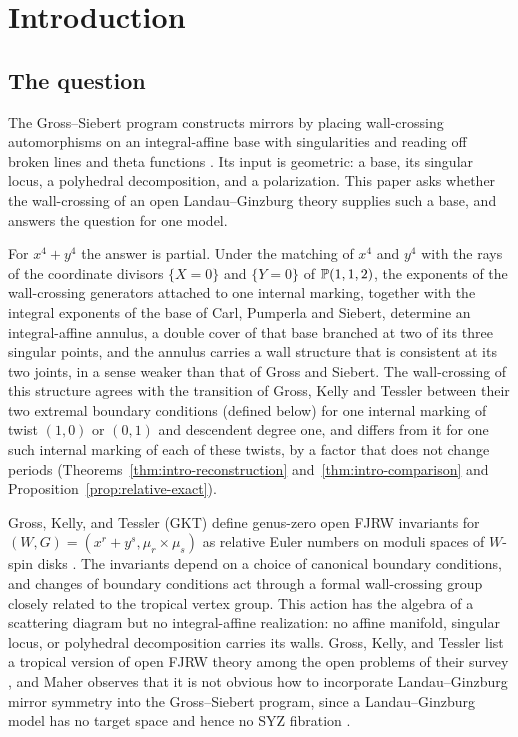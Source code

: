 \section{Introduction}\label{sec:introduction}

\subsection{The question}

The Gross--Siebert program constructs mirrors by placing wall-crossing
automorphisms on an integral-affine base with singularities and reading off
broken lines and theta functions
\cite{grosshackingkeel2015,grossetal2018canonical,grosssiebert2022}.  Its
input is geometric: a base, its singular locus, a polyhedral decomposition,
and a polarization.  This paper asks whether the wall-crossing of an open
Landau--Ginzburg theory supplies such a base, and answers the question for
one model.

For $x^4+y^4$ the answer is partial.  Under the matching of $x^4$ and $y^4$
with the rays of the coordinate divisors $\{X=0\}$ and $\{Y=0\}$ of
$\mathbb P(1,1,2)$, the exponents of the wall-crossing generators attached to one
internal marking, together with the integral exponents of the base of Carl,
Pumperla and Siebert, determine an integral-affine
annulus, a double cover of that base branched at two of its three singular
points, and the annulus carries a wall structure that is consistent at its
two joints, in a sense weaker than that of Gross and Siebert.  The
wall-crossing of this structure agrees with the transition of Gross, Kelly
and Tessler between their two extremal boundary conditions (defined below)
for one internal marking of twist $(1,0)$ or $(0,1)$ and descendent degree
one, and differs from it for one such internal marking of each of these
twists, by a factor that does not change periods
(Theorems~\ref{thm:intro-reconstruction} and~\ref{thm:intro-comparison} and
Proposition~\ref{prop:relative-exact}).

Gross, Kelly, and Tessler (GKT) define genus-zero open FJRW invariants for
$(W,G)=(x^r+y^s,\mu_r\times\mu_s)$ as relative Euler numbers on moduli spaces
of $W$-spin disks \cite{grossetal2022open}.  The invariants depend on a choice
of canonical boundary conditions, and changes of boundary conditions act
through a formal wall-crossing group closely related to the tropical vertex
group.  This action has the algebra of a scattering diagram but no
integral-affine realization: no affine manifold, singular locus, or
polyhedral decomposition carries its walls.  Gross, Kelly, and Tessler list a
tropical version of open FJRW theory among the open problems of their survey
\cite[\S6]{grossetal2026survey}, and Maher observes that it is not obvious
how to incorporate Landau--Ginzburg mirror symmetry into the Gross--Siebert
program, since a Landau--Ginzburg model has no target space and hence no SYZ
fibration \cite[Rem.~5.1.1]{maher2024predictions}.

